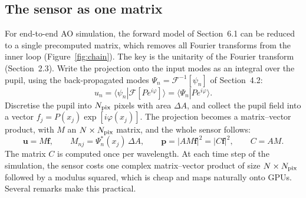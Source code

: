 \documentclass[11pt,a4paper]{article}
\newcommand{\uvec}{\mathbf{u}}
\newcommand{\fvec}{\mathbf{f}}
\newcommand{\pvec}{\mathbf{p}}
\newcommand{\braket}[2]{\langle #1|#2\rangle}
\begin{document}
\subsection{The sensor as one matrix}
\label{sec:onematrix}
For end-to-end AO simulation, the forward model of Section~6.1 can be reduced to a single precomputed matrix, which removes all Fourier transforms from the inner loop (Figure~\ref{fig:chain}). The key is the unitarity of the Fourier transform (Section~2.3). Write the projection onto the input modes as an integral over the pupil, using the back-propagated modes $\Psi_n = \mathcal{F}^{-1}[\psi_n]$ of Section~4.2:
\begin{equation}
u_n = \braket{\psi_n}{\mathcal{F}[P e^{i\varphi}]} = \braket{\Psi_n}{P e^{i\varphi}}.
\label{eq:back_prop}
\end{equation}
Discretise the pupil into $N_{\rm pix}$ pixels with area $\Delta A$, and collect the pupil field into a vector $f_j = P(x_j)\exp[i\varphi(x_j)]$. The projection becomes a matrix--vector product, with $M$ an $N \times N_{\rm pix}$ matrix, and the whole sensor follows:
\begin{equation}
\uvec = M\fvec,
\qquad
M_{nj} = \Psi_n^*(x_j)\,\Delta A,
\qquad
\pvec = \left|A M \fvec\right|^2 = \left|C \fvec\right|^2,
\qquad
C = A M.
\label{eq:sensor_matrix}
\end{equation}
The matrix $C$ is computed once per wavelength. At each time step of the simulation, the sensor costs one complex matrix--vector product of size $N \times N_{\rm pix}$ followed by a modulus squared, which is cheap and maps naturally onto GPUs. Several remarks make this practical.
\end{document}
